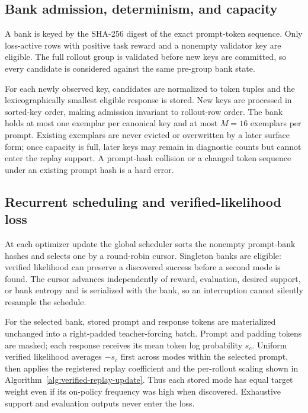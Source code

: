 \subsection{Bank admission, determinism, and capacity}
\label{app:algorithm-bank}

A bank is keyed by the SHA-256 digest of the exact prompt-token sequence.
Only loss-active rows with positive task reward and a nonempty validator key
are eligible. The full rollout group is validated before new keys are
committed, so every candidate is considered against the same pre-group bank
state.

For each newly observed key, candidates are normalized to token tuples and the
lexicographically smallest eligible response is stored. New keys are processed
in sorted-key order, making admission invariant to rollout-row order. The bank
holds at most one exemplar per canonical key and at most $M=16$ exemplars per
prompt. Existing exemplars are never evicted or overwritten by a later surface
form; once capacity is full, later keys may remain in diagnostic counts but
cannot enter the replay support. A prompt-hash collision or a changed token
sequence under an existing prompt hash is a hard error.

\subsection{Recurrent scheduling and verified-likelihood loss}
\label{app:algorithm-schedule}

At each optimizer update the global scheduler sorts the nonempty prompt-bank
hashes and selects one by a round-robin cursor. Singleton banks are eligible:
verified likelihood can preserve a discovered success before a second mode is
found. The cursor advances independently of reward, evaluation, desired
support, or bank entropy and is serialized with the bank, so an interruption
cannot silently resample the schedule.

For the selected bank, stored prompt and response tokens are materialized
unchanged into a right-padded teacher-forcing batch. Prompt and padding tokens
are masked; each response receives its mean token log probability $s_c$.
Uniform verified likelihood averages $-s_c$ first across modes within the
selected prompt, then applies the registered replay coefficient and the
per-rollout scaling shown in Algorithm~\ref{alg:verified-replay-update}.
Thus each stored mode has equal target weight even if its on-policy frequency
was high when discovered. Exhaustive support and evaluation outputs never enter
the loss.

